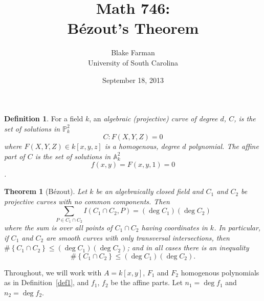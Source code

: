 \documentclass[10pt]{amsart}
\author{Blake Farman\\University of South Carolina}
\title{Math 746:\\B\'{e}zout's Theorem}
\date{September 18, 2013}
\begin{document}
\maketitle

\providecommand{\p}{\mathfrak{p}}
\providecommand{\m}{\mathfrak{m}}

\newtheorem{thm}{Theorem}
\newtheorem{lem}{Lemma}
\newtheorem{prop}{Proposition}
\theoremstyle{definition}
\newtheorem{defn}{Definition}

\newcommand{\A}{\mathbb{A}}

\begin{defn}\label{curve}
	For a field $k$, an \it{algebraic (projective) curve of degree $d$}, $C$, is the set of solutions in $\mathbb{P}^2_k$
		$$C \colon F(X,Y,Z) = 0$$
	where $F(X,Y,Z) \in k[x,y,z]$ is a homogenous, degree $d$ polynomial.
	The \it{affine part} of $C$ is the set of solutions in $\A_k^2$ $$f(x,y) = F(x,y,1) = 0$$.
\end{defn}


\begin{thm}[B\'{e}zout] 
	Let $k$ be an algebraically closed field and $C_1$ and $C_2$ be projective curves with no common components.
	Then 
		$$\sum_{P \in C_1 \cap C_2} I(C_1 \cap C_2, P) = (\deg{C_1})(\deg{C_2})$$
	where the sum is over all points of $C_1 \cap C_2$ having coordinates in $k$.
	In particular, if $C_1$ and $C_2$ are smooth curves with only transversal intersections, then $\#\left\{C_1 \cap C_2\right\} \leq (\deg{C_1})(\deg{C_2})$; and in all cases there is an inequality
		$$\#\left\{C_1 \cap C_2 \right\} \leq (\deg{C_1})(\deg{C_2}).$$
\end{thm}

Throughout, we will work with $A = k[x,y]$, $F_1$ and $F_2$ homogenous polynomials as in Definition~\ref{def1}, and $f_1$, $f_2$ be the affine parts.
Let $n_1 = \deg{f_1}$ and $n_2 = \deg{f_2}$.
\end{document}
